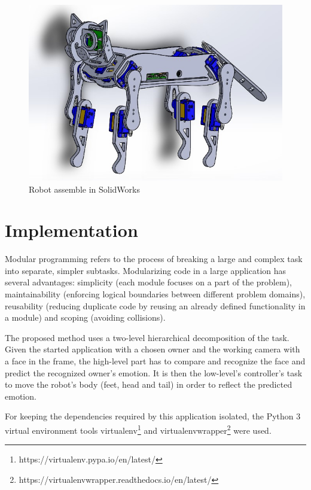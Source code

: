 \documentclass[runningheads,a4paper,12pt]{report}
\begin{document}
\begin{figure}
	\centering

  	\includegraphics[width=\linewidth]{./images/3_hardware}\hfill

    \caption{Robot assemble in SolidWorks}  
    \label{fig:3_hardware}
\end{figure}

\section{Implementation}
\label{chapter:implementation}

Modular programming refers to the process of breaking a large and complex task into separate, simpler subtasks. Modularizing code in a large application has several advantages: simplicity (each module focuses on a part of the problem), maintainability (enforcing logical boundaries between different problem domains), reusability (reducing duplicate code by reusing an already defined functionality in a module) and scoping (avoiding collisions). 

The proposed method uses a two-level hierarchical decomposition of the task. Given the started application with a chosen owner and the working camera with a face in the frame, the high-level part has to compare and recognize the face and predict the recognized owner's emotion. It is then the low-level's controller's task to move the robot's body (feet, head and tail) in order to reflect the predicted emotion. 

For keeping the dependencies required by this application isolated, the Python 3 virtual environment tools virtualenv\footnote{https://virtualenv.pypa.io/en/latest/} and virtualenvwrapper\footnote{https://virtualenvwrapper.readthedocs.io/en/latest/} were used. 
\end{document}
